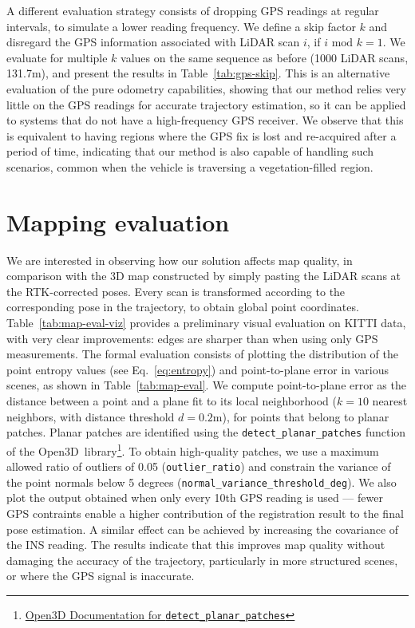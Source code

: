A different evaluation strategy consists of dropping GPS readings at regular intervals, to simulate a lower reading frequency. We define a skip factor $k$ and disregard the GPS information associated with LiDAR scan $i$, if $i \text{ mod } k =1$. We evaluate for multiple $k$ values on the same sequence as before (1000 LiDAR scans, 131.7m), and present the results in Table~\ref{tab:gps-skip}. This is an alternative evaluation of the pure odometry capabilities, showing that our method relies very little on the GPS readings for accurate trajectory estimation, so it can be applied to systems that do not have a high-frequency GPS receiver. We observe that this is equivalent to having regions where the GPS fix is lost and re-acquired after a period of time, indicating that our method is also capable of handling such scenarios, common when the vehicle is traversing a vegetation-filled region.

\section{Mapping evaluation}

We are interested in observing how our solution affects map quality, in comparison with the 3D map constructed by simply pasting the LiDAR scans at the RTK-corrected poses. Every scan is transformed according to the corresponding pose in the trajectory, to obtain global point coordinates. Table~\ref{tab:map-eval-viz} provides a preliminary visual evaluation on KITTI data, with very clear improvements: edges are sharper than when using only GPS measurements. The formal evaluation consists of plotting the distribution of the point entropy values (see Eq.~\ref{eq:entropy}) and point-to-plane error in various scenes, as shown in Table~\ref{tab:map-eval}. We compute point-to-plane error as the distance between a point and a plane fit to its local neighborhood ($k=10$ nearest neighbors, with distance threshold $d=0.2$m), for points that belong to planar patches. Planar patches are identified using the \texttt{detect\_planar\_patches} function of the Open3D~library\footnote{\href{https://www.open3d.org/docs/latest/python_api/open3d.geometry.PointCloud.html\#open3d.geometry.PointCloud.detect_planar_patches}{Open3D Documentation for \texttt{detect\_planar\_patches}}}. To obtain high-quality patches, we use a maximum allowed ratio of outliers of 0.05 (\texttt{outlier\_ratio}) and constrain the variance of the point normals below 5 degrees (\texttt{normal\_variance\_threshold\_deg}).
We also plot the output obtained when only every 10th GPS reading is used --- fewer GPS contraints enable a higher contribution of the registration result to the final pose estimation. A similar effect can be achieved by increasing the covariance of the INS reading. The results indicate that this improves map quality without damaging the accuracy of the trajectory, particularly in more structured scenes, or where the GPS signal is inaccurate.


